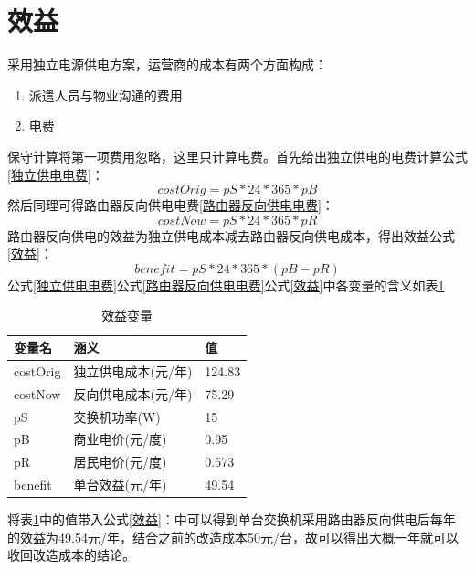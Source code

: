\documentclass[12pt,a4paper]{report}
\begin{document}
\section{效益}
采用独立电源供电方案，运营商的成本有两个方面构成：
\begin{enumerate}
    \item 派遣人员与物业沟通的费用
    \item 电费
\end{enumerate}
保守计算将第一项费用忽略，这里只计算电费。首先给出独立供电的电费计算公式\ref{独立供电电费}：
\begin{equation}
    costOrig = pS * 24 * 365 * pB
    \label{独立供电电费}
\end{equation}
然后同理可得路由器反向供电电费\ref{路由器反向供电电费}：
\begin{equation}
    costNow = pS * 24 * 365 * pR
    \label{路由器反向供电电费}
\end{equation}
路由器反向供电的效益为独立供电成本减去路由器反向供电成本，得出效益公式\ref{效益}：
\begin{equation}
    benefit = pS * 24 * 365 * (pB - pR)
    \label{效益}
\end{equation}
公式\ref{独立供电电费}公式\ref{路由器反向供电电费}公式\ref{效益}中各变量的含义如表\ref{效益变量}
\begin{table}[!hbp]
    \begin{center}
        \begin{tabular}{|l|l|l|}
            \hline
            变量名 & 涵义 & 值 \\
            \hline
            costOrig & 独立供电成本(元/年) & 124.83 \\
            \hline
            costNow & 反向供电成本(元/年) & 75.29 \\
            \hline
            pS & 交换机功率(W) & 15 \\
            \hline
            pB & 商业电价(元/度) & 0.95 \\
            \hline
            pR & 居民电价(元/度) & 0.573 \\
            \hline
            benefit & 单台效益(元/年) &  49.54 \\
            \hline
        \end{tabular}
        \caption{效益变量\label{效益变量}}
    \end{center}
\end{table}
将表\ref{效益变量}中的值带入公式\ref{效益}：中可以得到单台交换机采用路由器反向供电后每年的效益为49.54元/年，结合之前的改造成本50元/台，故可以得出大概一年就可以收回改造成本的结论。
\end{document}
